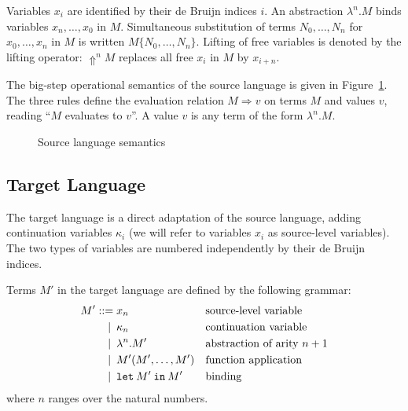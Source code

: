 \documentclass[a4paper,11pt,draft]{article}
\newcommand{\kw}[1]{\mathtt{#1}}
\begin{document}
Variables $x_{i}$ are identified by their de Bruijn indices $i$.
An abstraction $\lambda^{n}.M$ binds variables $x_{n}, \ldots, x_{0}$ in $M$.
Simultaneous substitution of terms $N_{0}, \ldots, N_{n}$ for
$x_{0}, \ldots, x_{n}$ in $M$ is written $M\{N_{0}, \ldots, N_{n}\}$.
Lifting of free variables is denoted by the lifting operator: $\Uparrow^{n} M$
replaces all free $x_{i}$ in $M$ by $x_{i+n}$.


The big-step operational semantics of the source language is given in
Figure~\ref{fig:sourcesemantics}. The three rules define the evaluation relation
$M \Rightarrow v$ on terms $M$ and values $v$, reading ``$M$ evaluates to $v$''.
A value $v$ is any term of the form $\lambda^{n}.M$.

\begin{figure}
\caption{Source language semantics}
\label{fig:sourcesemantics}
\end{figure}

\subsection{Target Language}

The target language is a direct adaptation of the source language, adding
continuation variables $\kappa_{i}$ (we will refer to variables $x_{i}$
as source-level variables). The two types of variables are numbered
independently by their de Bruijn indices.

Terms $M'$ in the target language are defined by the following grammar:
\begin{align*}
M' ::=            &\; x_{n}
                  && \text{source-level variable} \\
\llap{\textbar\:} &\; \kappa_{n}
                  && \text{continuation variable} \\
\llap{\textbar\:} &\; \lambda^{n}.M'
                  && \text{abstraction of arity $n+1$} \\
\llap{\textbar\:} &\; M'(M', \ldots, M')
                  && \text{function application} \\
\llap{\textbar\:} &\; \kw{let} \: M' \: \kw{in} \: M'
                  && \text{binding}
\end{align*}
where $n$ ranges over the natural numbers.
\end{document}
